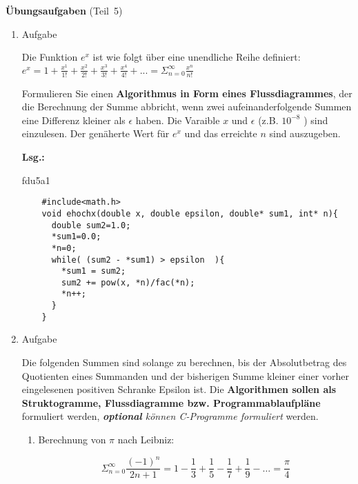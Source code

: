 \documentclass[12pt,a4paper,ngerman]{scrreprt}
\newcommand{\Lsg}{\par \textbf{Lsg.: } \hfill}
\begin{document}

\large{\textbf{Übungsaufgaben} (Teil~5)}

\begin{enumerate}

\item Aufgabe %

Die Funktion $ e^x $ ist wie folgt über eine unendliche Reihe definiert: \\

\begin{math}
e^x = 1 + \frac{x^1}{1!} + \frac{x^2}{2!} + \frac{x^3}{3!} + \frac{x^4}{4!} + ...
= \Sigma_{n=0}^{\infty} \frac{x^n}{n!}
\end{math}

\par Formulieren Sie einen \textbf{Algorithmus in Form eines Flussdiagrammes}, der die Berechnung der Summe abbricht, wenn zwei aufeinanderfolgende Summen eine Differenz kleiner als $\epsilon$ haben.
Die Varaible $x$ und $\epsilon$ (z.B. $10^{-8}$ ) sind einzulesen. Der genäherte Wert für $ e^x $ und das erreichte $ n $ sind auszugeben.

\Lsg


{fdu5a1}

\begin{lstlisting}
    #include<math.h>
    void ehochx(double x, double epsilon, double* sum1, int* n){
      double sum2=1.0;
      *sum1=0.0;
      *n=0;
      while( (sum2 - *sum1) > epsilon  ){
        *sum1 = sum2;
        sum2 += pow(x, *n)/fac(*n);
        *n++;
      }
    }
\end{lstlisting}

\item Aufgabe %

Die folgenden Summen sind solange zu berechnen, bis der Absolutbetrag des Quotienten eines Summanden und der bisherigen Summe kleiner einer vorher eingelesenen positiven Schranke Epsilon ist.
Die \textbf{Algorithmen sollen als Struktogramme, Flussdiagramme bzw. Programmablaufpläne} formuliert werden, \textit{\textbf{optional} können C-Programme formuliert} werden.

\begin{enumerate}
\item Berechnung von $\pi$ nach Leibniz:

\[
\Sigma_{n=0}^{\infty} \frac{(-1)^n}{2n+1} = 1-\frac{1}{3}+\frac{1}{5}-\frac{1}{7}+\frac{1}{9}-\ldots=\frac{\pi}{4}
\]


\end{enumerate}
\end{enumerate}
\end{document}
